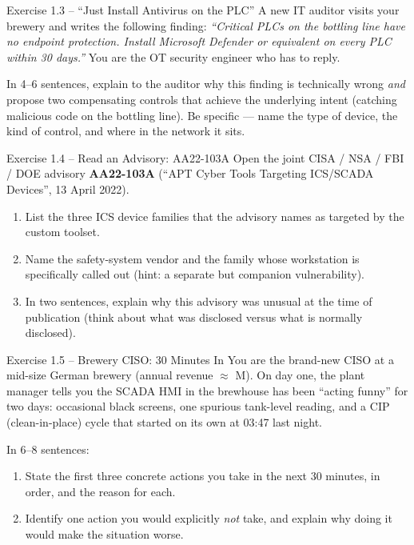 \documentclass[11pt,a4paper]{article}
\begin{document}
\begin{taskbox}{Exercise 1.3 -- ``Just Install Antivirus on the PLC''}
A new IT auditor visits your brewery and writes the following finding: \emph{``Critical PLCs on the bottling line have no endpoint protection. Install Microsoft Defender or equivalent on every PLC within 30 days.''} You are the OT security engineer who has to reply.

In 4--6 sentences, explain to the auditor why this finding is technically wrong \emph{and} propose two compensating controls that achieve the underlying intent (catching malicious code on the bottling line). Be specific --- name the type of device, the kind of control, and where in the network it sits.
\end{taskbox}

\begin{taskbox}{Exercise 1.4 -- Read an Advisory: AA22-103A}
Open the joint CISA / NSA / FBI / DOE advisory \textbf{AA22-103A} (``APT Cyber Tools Targeting ICS/SCADA Devices'', 13 April 2022).
\begin{enumerate}
  \item List the three ICS device families that the advisory names as targeted by the custom toolset.
  \item Name the safety-system vendor and the family whose workstation is specifically called out (hint: a separate but companion vulnerability).
  \item In two sentences, explain why this advisory was unusual at the time of publication (think about what was disclosed versus what is normally disclosed).
\end{enumerate}
\end{taskbox}

\begin{taskbox}{Exercise 1.5 -- Brewery CISO: 30 Minutes In}
You are the brand-new CISO at a mid-size German brewery (annual revenue $\approx$\,\,M). On day one, the plant manager tells you the SCADA HMI in the brewhouse has been ``acting funny'' for two days: occasional black screens, one spurious tank-level reading, and a CIP (clean-in-place) cycle that started on its own at 03:47 last night.

In 6--8 sentences:
\begin{enumerate}
  \item State the first three concrete actions you take in the next 30 minutes, in order, and the reason for each.
  \item Identify one action you would explicitly \emph{not} take, and explain why doing it would make the situation worse.
\end{enumerate}
\end{taskbox}
\end{document}
